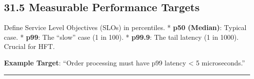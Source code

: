 \hypertarget{measurable-performance-targets}{%
\subsection{31.5 Measurable Performance
Targets}\label{measurable-performance-targets}}

Define Service Level Objectives (SLOs) in percentiles. * \textbf{p50
(Median)}: Typical case. * \textbf{p99}: The ``slow'' case (1 in 100). *
\textbf{p99.9}: The tail latency (1 in 1000). Crucial for HFT.

\textbf{Example Target}: ``Order processing must have p99 latency
\textless{} 5 microseconds.''

\begin{center}\rule{0.5\linewidth}{0.5pt}\end{center}

